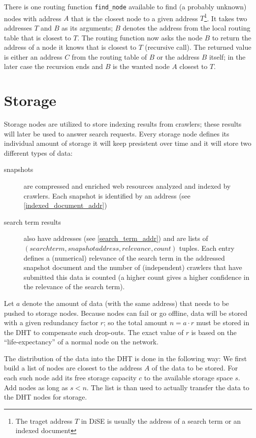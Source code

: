 \documentclass[a4paper,8pt,twocolumn]{scrartcl}
\begin{document}
There is one routing function {\tt find\_node} available to find (a probably unknown) nodes with address $A$ that is the closest node to a given address $T$\footnote{The traget address $T$ in DiSE is usually the address of a search term or an indexed document}. It takes two addresses $T$ and $B$ as its arguments; $B$ denotes the address from the local routing table that is closest to $T$. The routing function now asks the node $B$ to return the address of a node it knows that is closest to $T$ (recursive call). The returned value is either an address $C$ from the routing table of $B$ or the address $B$ itself; in the later case the recursion ends and $B$ is the wanted node $A$ closest to $T$.

\section{Storage}

Storage nodes are utilized to store indexing results from crawlers; these results will later be used to answer search requests. Every storage node defines its individual amount of storage it will keep presistent over time and it will store two different types of data:

\begin{description}
 \item [snapshots] are compressed and enriched web resources analyzed and indexed by crawlers. Each snapshot is identified by an address (see \ref{indexed_document_addr})
 \item [search term results] also have addresses (see \ref{search_term_addr}) and are lists of $(search term,snapshot address,relevance,count)$ tuples. Each entry defines a (numerical) relevance of the search term in the addressed snapshot document and the number of (independent) crawlers that have submitted this data is counted (a higher count gives a higher confidence in the relevance of the search term).
\end{description}

Let $a$ denote the amount of data (with the same address) that needs to be pushed to storage nodes. Because nodes can fail or go offline, data will be stored with a given redundancy factor $r$; so the total amount $n = a \cdot r$ must be stored in the DHT to compensate such drop-outs. The exact value of $r$ is based on the ``life-expectancy'' of a normal node on the network.

The distribution of the data into the DHT is done in the following way: We first build a list of nodes are closest to the address $A$ of the data to be stored. For each such node add its free storage capacity $c$ to the available storage space $s$. Add nodes as long as $s < n$. The list is than used to actually transfer the data to the DHT nodes for storage.
\end{document}

